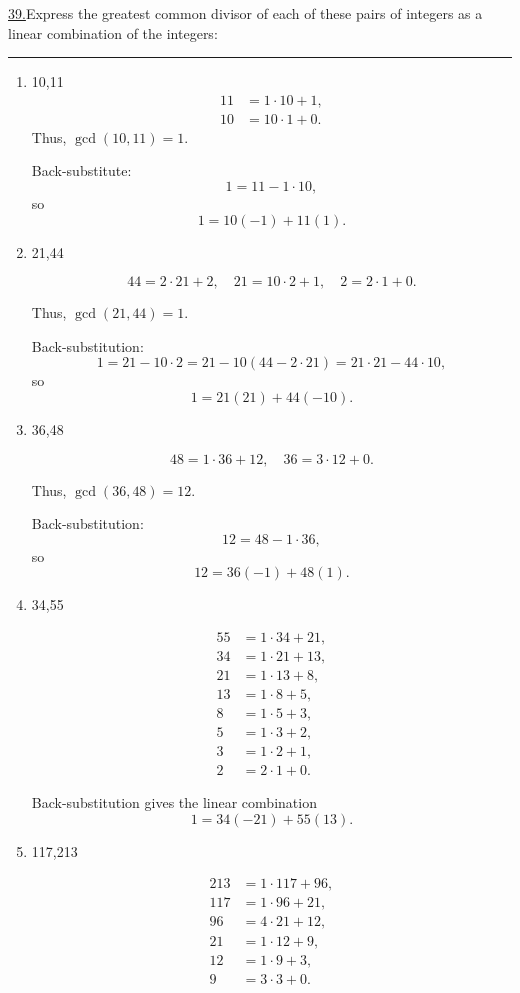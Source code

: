 \documentclass[12pt]{article}
\begin{document}
\newpage
\noindent\underline{39.}Express the greatest common divisor of each of these pairs of integers as a linear combination of the integers:
\\\rule{\linewidth}{0.5pt}
\begin{enumerate} [label=(\alph*)]
    \item 10,11 
    \[
    \begin{aligned}
    11 &= 1 \cdot 10 + 1, \\
    10 &= 10 \cdot 1 + 0.
    \end{aligned}
    \]
Thus, $\gcd(10,11) = 1$.

Back-substitute:
    \[
    1 = 11 - 1\cdot 10,
    \]
so
\[
1 = 10(-1) + 11(1).
\]

    \item 21,44

\[44 = 2\cdot21 + 2,\quad 21 = 10\cdot 2 + 1,\quad 2 = 2\cdot 1 + 0.\]

Thus, $\gcd(21,44) = 1$.

Back-substitution:
\[
1 = 21 - 10\cdot 2 = 21 - 10(44 - 2\cdot21) = 21\cdot21 - 44\cdot10,
\]
so
\[
1 = 21(21) + 44(-10).
\]

\item 36,48

\[
48 = 1\cdot36 + 12,\quad 36 = 3\cdot12 + 0.
\]

Thus, $\gcd(36,48) = 12$.

Back-substitution:
\[
12 = 48 - 1\cdot36,
\]
so
\[
12 = 36(-1) + 48(1).
\]

\item 34,55

\[
\begin{aligned}
55 &= 1\cdot34 + 21, \\
34 &= 1\cdot21 + 13, \\
21 &= 1\cdot13 + 8, \\
13 &= 1\cdot8 + 5, \\
8 &= 1\cdot5 + 3, \\
5 &= 1\cdot3 + 2, \\
3 &= 1\cdot2 + 1, \\
2 &= 2\cdot1 + 0.
\end{aligned}
\]

Back-substitution gives the linear combination
\[
1 = 34(-21) + 55(13).
\]

\item 117,213

\[
\begin{aligned}
213 &= 1\cdot117 + 96, \\
117 &= 1\cdot96 + 21, \\
96 &= 4\cdot21 + 12, \\
21 &= 1\cdot12 + 9, \\
12 &= 1\cdot9 + 3, \\
9 &= 3\cdot3 + 0.
\end{aligned}
\]


\end{enumerate}
\end{document}
